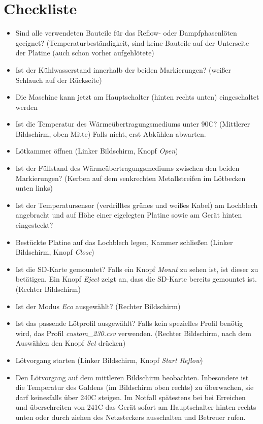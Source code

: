\documentclass{\basedir/fablab-document}
\begin{document}
	\section{Checkliste}

	\begin{itemize}

	\item Sind alle verwendeten Bauteile f{\"u}r das Reflow- oder Dampfphasenl{\"o}ten geeignet? (Temperaturbest{\"a}ndigkeit, sind keine Bauteile auf der Unterseite der Platine (auch schon vorher aufgehl{\"o}tete)
	\item Ist der K{\"u}hlwasserstand innerhalb der beiden Markierungen? (wei{\ss}er Schlauch auf der R{\"u}ckseite) 
	\item Die Maschine kann jetzt am Hauptschalter (hinten rechts unten) eingeschaltet werden
	\item Ist die Temperatur des W{\"a}rme{\"u}bertragungsmediums unter 90\textdegree C? (Mittlerer Bildschirm, oben Mitte) Falls nicht, erst Abk{\"u}hlen abwarten.
	\item L{\"o}tkammer {\"o}ffnen (Linker Bildschirm, Knopf \textit{Open})
	\item Ist der F{\"u}llstand des W{\"a}rme{\"u}bertragungsmediums zwischen den beiden Markierungen? (Kerben auf dem senkrechten Metallstreifen im L{\"o}tbecken unten links)
	\item Ist der Temperatursensor (verdrilltes gr{\"u}nes und wei{\ss}es Kabel) am Lochblech angebracht und auf H{\"o}he einer eigelegten Platine sowie am Ger{\"a}t hinten eingesteckt?
	\item Best{\"u}ckte Platine auf das Lochblech legen, Kammer schlie{\ss}en (Linker Bildschirm, Knopf \textit{Close})
	\item Ist die SD-Karte gemountet? Falls ein Knopf \textit{Mount} zu sehen ist, ist dieser zu bet{\"a}tigen. Ein Knopf \textit{Eject} zeigt an, dass die SD-Karte bereits gemountet ist. (Rechter Bildschirm)
	\item Ist der Modus \textit{Eco} ausgew{\"a}hlt? (Rechter Bildschirm)
	\item Ist das passende L{\"o}tprofil ausgew{\"a}hlt? Falls kein spezielles Profil ben{\"o}tig wird, das Profil \textit{custom\_230.csv} verwenden. (Rechter Bildschirm, nach dem Ausw{\"a}hlen den Knopf \textit{Set} dr{\"u}cken)
	\item L{\"o}tvorgang starten (Linker Bildschirm, Knopf \textit{Start Reflow})
	\item Den L{\"o}tvorgang auf dem mittleren Bildschirm beobachten. Inbesondere ist die Temperatur des Galdens (im Bildschirm oben rechts) zu {\"u}berwachen, sie darf keinesfalls {\"u}ber 240\textdegree C steigen. Im Notfall sp{\"a}testens bei bei Erreichen und {\"u}berschreiten von 241\textdegree C das Ger{\"a}t sofort am Hauptschalter hinten rechts unten oder durch ziehen des Netzsteckers ausschalten und Betreuer rufen. 

\end{itemize}
\end{document}
